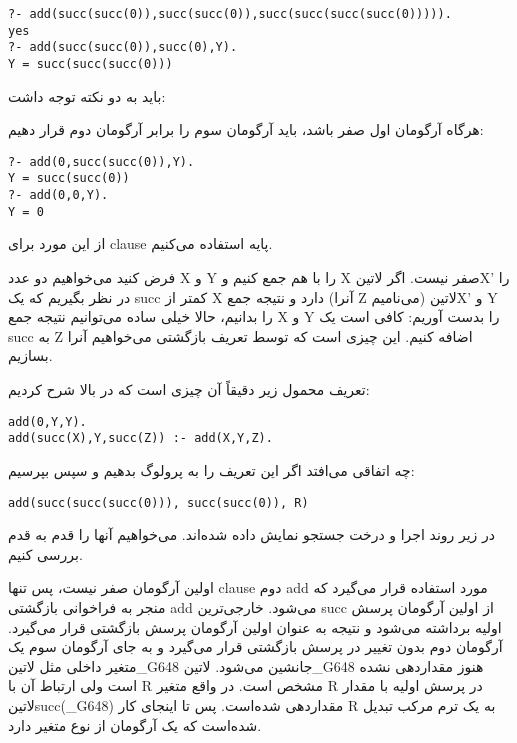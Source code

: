 \begin{latin}
\begin{lstlisting}
?- add(succ(succ(0)),succ(succ(0)),succ(succ(succ(succ(0))))).
yes
?- add(succ(succ(0)),succ(0),Y).
Y = succ(succ(succ(0)))
\end{lstlisting}
\end{latin}

باید به دو نکته توجه داشت:

\begin{enumerate}
 هرگاه آرگومان اول صفر باشد، باید آرگومان سوم را برابر آرگومان دوم قرار دهیم:
\begin{latin}
\begin{lstlisting}
?- add(0,succ(succ(0)),Y).
Y = succ(succ(0))
?- add(0,0,Y).
Y = 0
\end{lstlisting}
\end{latin}
از این مورد برای clause پایه استفاده می‌کنیم.

 فرض کنید می‌خواهیم دو عدد X و Y را با هم جمع کنیم و X صفر نیست. اگر ‌لاتین{X'} را در نظر بگیریم که یک succ کمتر از X‌ دارد و نتیجه جمع (آنرا Z می‌نامیم) ‌لاتین{X'} و Y را بدانیم، حالا خیلی ساده می‌توانیم نتیجه جمع X و Y را بدست آوریم: کافی است یک succ به Z اضافه کنیم. این چیزی است که توسط تعریف بازگشتی می‌خواهیم آنرا بسازیم.
\end{enumerate}

تعریف محمول زیر دقیقاً آن چیزی است که در بالا شرح کردیم:

\begin{latin}
\begin{lstlisting}
add(0,Y,Y).
add(succ(X),Y,succ(Z)) :- add(X,Y,Z).
\end{lstlisting}
\end{latin}

چه اتفاقی می‌افتد اگر این تعریف را به پرولوگ بدهیم و سپس بپرسیم:

\begin{latin}
\begin{lstlisting}
add(succ(succ(succ(0))), succ(succ(0)), R)
\end{lstlisting}
\end{latin}

در زیر روند اجرا و درخت جستجو نمایش داده شده‌اند. می‌خواهیم آنها را قدم به قدم بررسی کنیم.

اولین آرگومان صفر نیست، پس تنها clause دوم add مورد استفاده قرار می‌گیرد که منجر به فراخوانی بازگشتی add می‌شود. خارجی‌ترین succ از اولین آرگومان پرسش اولیه برداشته می‌شود و نتیجه به عنوان اولین آرگومان پرسش بازگشتی قرار می‌گیرد. آرگومان دوم بدون تغییر در پرسش بازگشتی قرار می‌گیرد و به جای آرگومان سوم یک متغیر داخلی مثل ‌لاتین{\_G648} جانشین می‌شود. ‌لاتین{\_G648} هنوز مقداردهی نشده است ولی ارتباط آن با R مشخص است. در واقع متغیر R در پرسش اولیه با مقدار ‌لاتین{succ(\_G648)} مقداردهی شده‌است. پس تا اینجای کار R به یک ترم مرکب تبدیل شده‌است که یک آرگومان از نوع متغیر دارد.

